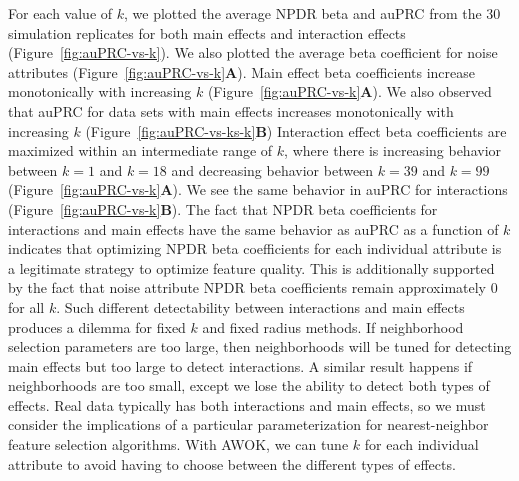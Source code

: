 \documentclass[10pt,letterpaper]{article}
\begin{document}
For each value of $k$, we plotted the average NPDR beta and auPRC from the 30 simulation replicates for both main effects and interaction effects (Figure~\ref{fig:auPRC-vs-k}). We also plotted the average beta coefficient for noise attributes (Figure~\ref{fig:auPRC-vs-k}\textbf{A}). Main effect beta coefficients increase monotonically with increasing $k$ (Figure~\ref{fig:auPRC-vs-k}\textbf{A}). We also observed that auPRC for data sets with main effects increases monotonically with increasing $k$ (Figure~\ref{fig:auPRC-vs-ks-k}\textbf{B}) Interaction effect beta coefficients are maximized within an intermediate range of $k$, where there is increasing behavior between $k=1$ and $k=18$ and decreasing behavior between $k=39$ and $k=99$ (Figure~\ref{fig:auPRC-vs-k}\textbf{A}). We see the same behavior in auPRC for interactions (Figure~\ref{fig:auPRC-vs-k}\textbf{B}). The fact that NPDR beta coefficients for interactions and main effects have the same behavior as auPRC as a function of $k$ indicates that optimizing NPDR beta coefficients for each individual attribute is a legitimate strategy to optimize feature quality. This is additionally supported by the fact that noise attribute NPDR beta coefficients remain approximately 0 for all $k$. Such different detectability between interactions and main effects produces a dilemma for fixed $k$ and fixed radius methods. If neighborhood selection parameters are too large, then neighborhoods will be tuned for detecting main effects but too large to detect interactions. A similar result happens if neighborhoods are too small, except we lose the ability to detect both types of effects. Real data typically has both interactions and main effects, so we must consider the implications of a particular parameterization for nearest-neighbor feature selection algorithms. With AWOK, we can tune $k$ for each individual attribute to avoid having to choose between the different types of effects.
\end{document}
